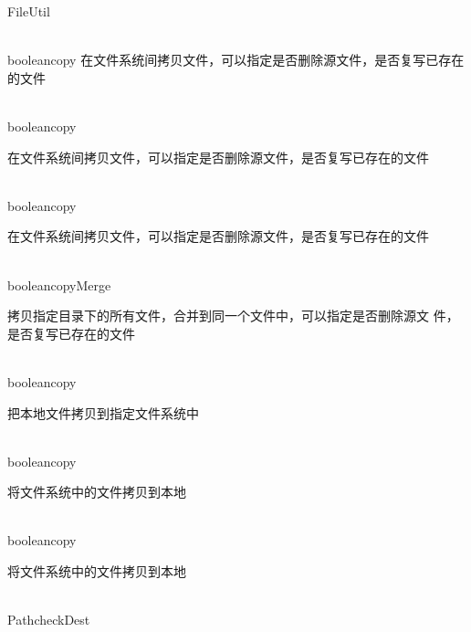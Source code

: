 \begin{XeClass}{FileUtil}
\begin{XeMethod}{\XePublic\\ }{boolean}{copy}
 在文件系统间拷贝文件，可以指定是否删除源文件，是否复写已存在的文件

  \end{XeMethod}

  \begin{XeMethod}{\XePublic\\ }{boolean}{copy}
       
 在文件系统间拷贝文件，可以指定是否删除源文件，是否复写已存在的文件

  \end{XeMethod}

  \begin{XeMethod}{\XePrivate\\ }{boolean}{copy}
       
 在文件系统间拷贝文件，可以指定是否删除源文件，是否复写已存在的文件

  \end{XeMethod}

  \begin{XeMethod}{\XePublic\\ }{boolean}{copyMerge}
       
 拷贝指定目录下的所有文件，合并到同一个文件中，可以指定是否删除源文
 件，是否复写已存在的文件

  \end{XeMethod}

  \begin{XeMethod}{\XePublic\\ }{boolean}{copy}
       
 把本地文件拷贝到指定文件系统中

  \end{XeMethod}

  \begin{XeMethod}{\XePublic\\ }{boolean}{copy}
       
 将文件系统中的文件拷贝到本地

  \end{XeMethod}

  \begin{XeMethod}{\XePrivate\\ }{boolean}{copy}
       
 将文件系统中的文件拷贝到本地

  \end{XeMethod}

  \begin{XeMethod}{\XePrivate\\ }{Path}{checkDest}
       

\end{XeMethod}
\end{XeClass}
